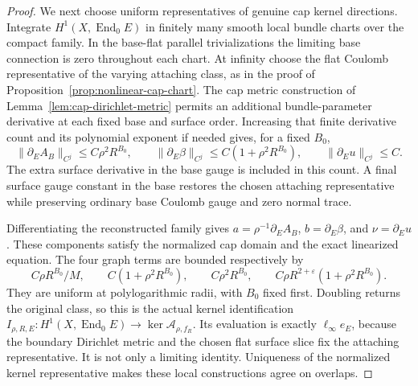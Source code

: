 \documentclass[11pt]{amsart}
\theoremstyle{definition}
\theoremstyle{remark}
\theoremstyle{plain}
\newcommand{\End}{\operatorname{End}}
\begin{document}
\begin{proof}
We next choose uniform representatives of genuine cap kernel
directions. Integrate $H^1(X,\End_0E)$ in finitely many smooth
local bundle charts over the compact family. In the base-flat
parallel trivializations the limiting base connection is zero
throughout each chart. At infinity choose the flat Coulomb
representative of the varying attaching class, as in the proof
of Proposition~\ref{prop:nonlinear-cap-chart}. The cap metric
construction of Lemma~\ref{lem:cap-dirichlet-metric}
permits an additional bundle-parameter derivative at each fixed
base and surface order. Increasing that finite derivative
count and its polynomial exponent if needed gives, for a fixed
$B_0$,
\begin{equation}\label{eq:cap-kernel-parameter-bounds}
 \|\partial_EA_B\|_{C^j}\leq C\rho^2R^{B_0},\qquad
 \|\partial_E\beta\|_{C^j}\leq C(1+\rho^2R^{B_0}),\qquad
 \|\partial_Eu\|_{C^j}\leq C.
\end{equation}
The extra surface derivative in the base gauge is included
in this count. A final surface gauge constant in the base
restores the chosen attaching representative while preserving
ordinary base Coulomb gauge and zero normal trace.

Differentiating the reconstructed family gives
$a=\rho^{-1}\partial_EA_B$, $b=\partial_E\beta$, and
$\nu=\partial_Eu$. These components satisfy the normalized
cap domain and the exact linearized equation. The four graph
terms are bounded respectively by
\begin{equation}\label{eq:cap-kernel-graph-bounds}
 C\rho R^{B_0}/M,\qquad C(1+\rho^2R^{B_0}),\qquad
 C\rho^2R^{B_0},\qquad
 C\rho R^{2+\varepsilon}(1+\rho^2R^{B_0}).
\end{equation}
They are uniform at polylogarithmic radii, with $B_0$ fixed
first. Doubling returns the original class, so this is the
actual kernel identification
$I_{\rho,R,E}:H^1(X,\End_0E)\to\ker\mathcal A_{\rho,f_R}$.
Its evaluation is exactly $\ell_\infty e_E$, because the
boundary Dirichlet metric and the chosen flat surface slice
fix the attaching representative. It is not only a limiting
identity. Uniqueness of the normalized kernel representative
makes these local constructions agree on overlaps.


\end{proof}
\end{document}
